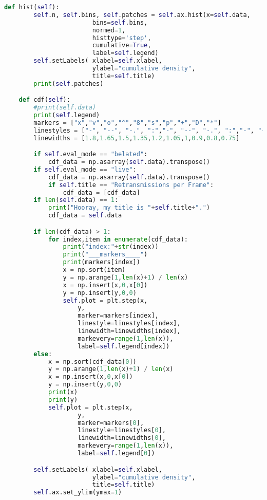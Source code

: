 \begin{lstlisting}[language=Python,caption=myplot.py]
    def hist(self):
        self.n, self.bins, self.patches = self.ax.hist(x=self.data,
                        bins=self.bins,
                        normed=1,
                        histtype='step',
                        cumulative=True,
                        label=self.legend)
        self.setLabels( xlabel=self.xlabel,
                        ylabel="cumulative density",
                        title=self.title)
        print(self.patches)

    def cdf(self):
        #print(self.data)
        print(self.legend)
        markers = ["x","v","o","^","8","s","p","+","D","*"]
        linestyles = ["-", "--", "-.", ":","-", "--", "-.", ":","-", "--"]
        linewidths = [1.8,1.65,1.5,1.35,1.2,1.05,1,0.9,0.8,0.75]

        if self.eval_mode == "belated":
            cdf_data = np.asarray(self.data).transpose()
        if self.eval_mode == "live":
            cdf_data = np.asarray(self.data).transpose()
            if self.title == "Retransmissions per Frame":
                cdf_data = [cdf_data]
        if len(self.data) == 1:
            print("Hooray, my title is "+self.title+".")
            cdf_data = self.data

        if len(cdf_data) > 1:
            for index,item in enumerate(cdf_data):
                print("index:"+str(index))
                print("___markers____")
                print(markers[index])
                x = np.sort(item)
                y = np.arange(1,len(x)+1) / len(x)
                x = np.insert(x,0,x[0])
                y = np.insert(y,0,0)
                self.plot = plt.step(x,
                    y,
                    marker=markers[index],
                    linestyle=linestyles[index],
                    linewidth=linewidths[index],
                    markevery=range(1,len(x)),
                    label=self.legend[index])
        else:
            x = np.sort(cdf_data[0])
            y = np.arange(1,len(x)+1) / len(x)
            x = np.insert(x,0,x[0])
            y = np.insert(y,0,0)
            print(x)
            print(y)
            self.plot = plt.step(x,
                    y,
                    marker=markers[0],
                    linestyle=linestyles[0],
                    linewidth=linewidths[0],
                    markevery=range(1,len(x)),
                    label=self.legend[0])

        self.setLabels( xlabel=self.xlabel,
                        ylabel="cumulative density",
                        title=self.title)
        self.ax.set_ylim(ymax=1)


\end{lstlisting}
